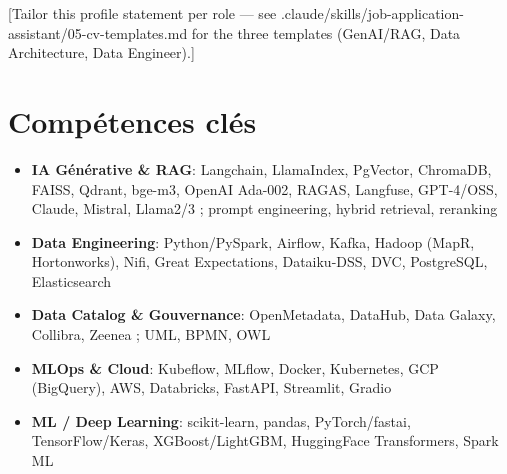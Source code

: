 \documentclass[11pt,a4paper,sans]{moderncv}
\begin{document}
\makecvtitle


\vspace{6pt}
\small{[Tailor this profile statement per role — see .claude/skills/job-application-assistant/05-cv-templates.md for the three templates (GenAI/RAG, Data Architecture, Data Engineer).]}


\section{Compétences clés}
\vspace{1pt}
\begin{itemize}

\item \textbf{IA Générative \& RAG}: Langchain, LlamaIndex, PgVector, ChromaDB, FAISS, Qdrant, bge-m3, OpenAI Ada-002, RAGAS, Langfuse, GPT-4/OSS, Claude, Mistral, Llama2/3 ; prompt engineering, hybrid retrieval, reranking

\item \textbf{Data Engineering}: Python/PySpark, Airflow, Kafka, Hadoop (MapR, Hortonworks), Nifi, Great Expectations, Dataiku-DSS, DVC, PostgreSQL, Elasticsearch

\item \textbf{Data Catalog \& Gouvernance}: OpenMetadata, DataHub, Data Galaxy, Collibra, Zeenea ; UML, BPMN, OWL

\item \textbf{MLOps \& Cloud}: Kubeflow, MLflow, Docker, Kubernetes, GCP (BigQuery), AWS, Databricks, FastAPI, Streamlit, Gradio

\item \textbf{ML / Deep Learning}: scikit-learn, pandas, PyTorch/fastai, TensorFlow/Keras, XGBoost/LightGBM, HuggingFace Transformers, Spark ML

\end{itemize}

\end{document}
